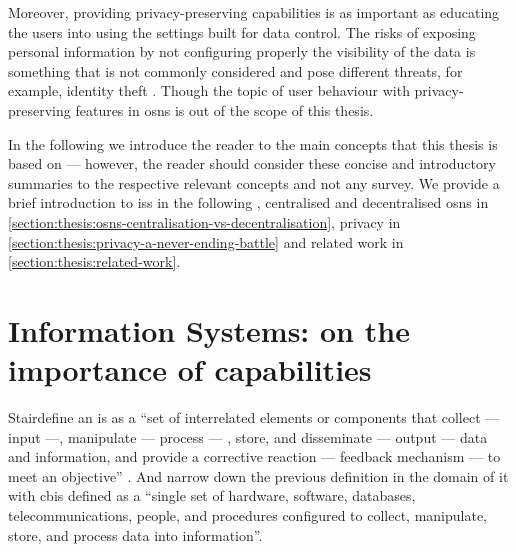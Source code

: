 Moreover, providing privacy-preserving capabilities is as important as educating 
the users into using the settings built for data control. The risks of exposing 
personal information by not configuring properly the visibility of the data is something 
that is not commonly considered and pose different threats, for example, identity 
theft \cite{GrossAH05, BrandtzaegLS10}. Though the topic of user behaviour with 
privacy-preserving features in \acp{osn} is out of the scope of this thesis.

In the following 
we introduce the reader to the main concepts that this thesis is based on --- however,
the reader should consider these  
concise and introductory summaries to the respective relevant concepts and not any 
survey. 
We provide a brief introduction to \acp{is} in the following ,
centralised and decentralised \acp{osn} in \cref{section:thesis:osns-centralisation-vs-decentralisation}, 
privacy in \cref{section:thesis:privacy-a-never-ending-battle} and related work 
in \cref{section:thesis:related-work}.

\section{Information Systems: on the importance of capabilities}
    \label{section:thesis:information-systems-on-the-importance-of-capabilities}

Stair\etal define an \ac{is} as a ``set of interrelated elements or components 
that collect --- input ---, manipulate --- process --- , store, and disseminate 
--- output --- data and information, and provide a corrective reaction --- feedback 
mechanism --- to meet an objective'' \cite{StairR15}. And narrow down the previous 
definition in the domain of \ac{it} with \ac{cbis} defined as a ``single set of 
hardware, software, databases, telecommunications, people, and procedures configured 
to collect, manipulate, store, and process data into information''. 

